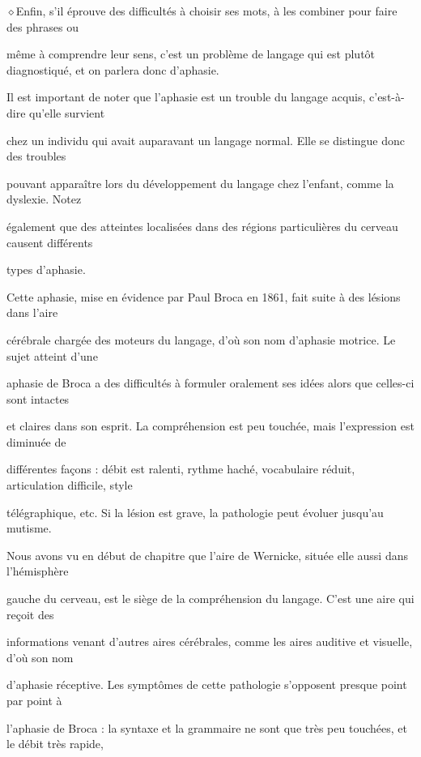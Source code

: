 \noindent\textcolor{BellaTeal}{$\diamond$}\enspace Enfin, s’il éprouve des difficultés à choisir ses mots, à les combiner pour faire des phrases ou\par
même à comprendre leur sens, c’est un problème de langage qui est plutôt diagnostiqué, et on
parlera donc d’aphasie.

Il est important de noter que l’aphasie est un trouble du langage acquis, c’est-à-dire qu’elle survient

chez un individu qui avait auparavant un langage normal. Elle se distingue donc des troubles

pouvant apparaître lors du développement du langage chez l'enfant, comme la dyslexie. Notez

également que des atteintes localisées dans des régions particulières du cerveau causent différents

types d’aphasie.


Cette aphasie, mise en évidence par Paul Broca en 1861, fait suite à des lésions dans l'aire

cérébrale chargée des moteurs du langage, d'où son nom d’aphasie motrice. Le sujet atteint d’une

aphasie de Broca a des difficultés à formuler oralement ses idées alors que celles-ci sont intactes

et claires dans son esprit. La compréhension est peu touchée, mais l'expression est diminuée de

différentes façons : débit est ralenti, rythme haché, vocabulaire réduit, articulation difficile, style

télégraphique, etc. Si la lésion est grave, la pathologie peut évoluer jusqu'au mutisme.


Nous avons vu en début de chapitre que l'aire de Wernicke, située elle aussi dans l’hémisphère

gauche du cerveau, est le siège de la compréhension du langage. C’est une aire qui reçoit des

informations venant d’autres aires cérébrales, comme les aires auditive et visuelle, d’où son nom

d’aphasie réceptive. Les symptômes de cette pathologie s'opposent presque point par point à

l’aphasie de Broca : la syntaxe et la grammaire ne sont que très peu touchées, et le débit très rapide,

